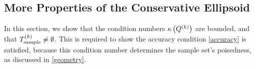 
% 


% 



\subsection{More Properties of the Conservative Ellipsoid}
\label{bounded_condition_numbers_section}
In this section, we show that the condition numbers ${\kappa}\left({Q^{(k)}}\right)$ are bounded, and that ${T_{\text{sample}}^{(k)}} \ne \emptyset$.
This is required to show the accuracy condition \cref{accuracy} is satisfied,
because this condition number determines the sample set's poisedness, as discussed in \cref{geometry}.

